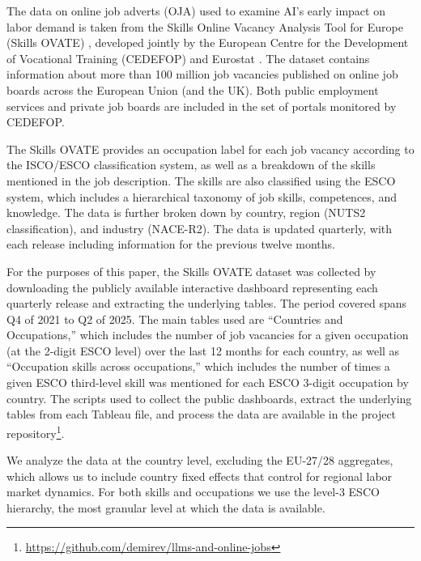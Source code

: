 \documentclass[11pt]{article}
\begin{document}
The data on online job adverts (OJA) used to examine AI's early impact on labor demand is taken from the Skills Online Vacancy Analysis Tool for Europe (Skills OVATE) \cite{cedefop_skills_ovate}, developed jointly by the European Centre for the Development of Vocational Training (CEDEFOP) and Eurostat \cite{cedefop2019online}. The dataset contains information about more than 100 million job vacancies published on online job boards across the European Union (and the UK). Both public employment services and private job boards are included in the set of portals monitored by CEDEFOP.

The Skills OVATE provides an occupation label for each job vacancy according to the ISCO/ESCO classification system, as well as a breakdown of the skills mentioned in the job description. The skills are also classified using the ESCO system, which includes a hierarchical taxonomy of job skills, competences, and knowledge. The data is further broken down by country, region (NUTS2 classification), and industry (NACE-R2). The data is updated quarterly, with each release including information for the previous twelve months.

For the purposes of this paper, the Skills OVATE dataset was collected by downloading the publicly available interactive dashboard representing each quarterly release and extracting the underlying tables. The period covered spans Q4 of 2021 to Q2 of 2025. The main tables used are ``Countries and Occupations,'' which includes the number of job vacancies for a given occupation (at the 2-digit ESCO level) over the last 12 months for each country, as well as ``Occupation skills across occupations,'' which includes the number of times a given ESCO third-level skill was mentioned for each ESCO 3-digit occupation by country. The scripts used to collect the public dashboards, extract the underlying tables from each Tableau file, and process the data are available in the project repository\footnote{\url{https://github.com/demirev/llms-and-online-jobs}}.

We analyze the data at the country level, excluding the EU-27/28 aggregates, which allows us to include country fixed effects that control for regional labor market dynamics. For both skills and occupations we use the level-3 ESCO hierarchy, the most granular level at which the data is available.
\end{document}
